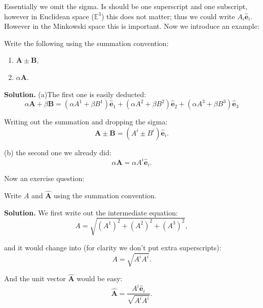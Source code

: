 \documentclass[10pt]{article}
\begin{document}
	Essentially we omit the sigma. Is should be one superscript and one subscript, however in Euclidean space ($\mathbb{E}^{3}$) this does not matter; thus we could write $A_{i}\hat{\mathbf{e}}_{i}$. However in the Minkowski space this is important. Now we introduce an example:
	\begin{example}
		Write the following using the summation convention:
		\begin{enumerate}
			\item {$\mathbf{A} \pm \mathbf{B}$,}
			\item {$\alpha \mathbf{A}$.}
		\end{enumerate}

		\vspace{1\baselineskip}
		\textbf{Solution.} (a)The first one is easily deducted:
		\begin{equation}
		  \alpha \mathbf{A} + \beta \mathbf{B} = (\alpha A^{1} + \beta B^{1})\hat{\mathbf{e}}_1 + (\alpha A^{2} + \beta B^{2})\hat{\mathbf{e}}_2 + (\alpha A^{3} + \beta B^{3})\hat{\mathbf{e}}_3
		\end{equation}

		Writing out the summation and dropping the sigma:
		\begin{equation}
		  \mathbf{A} \pm \mathbf{B} = (A^{i}\pm B^{i})\hat{\mathbf{e}}_{i}.
		\end{equation}

		(b) the second one we already did:
		\begin{equation}
		  \alpha \mathbf{A} = \alpha A^{i}\hat{\mathbf{e}}_{i}.
		\end{equation}
	\end{example}

	Now an exercise question:
	\begin{exercise}
		Write $A$ and $\hat{\mathbf{A}}$ using the summation convention. 
		
		\vspace{1\baselineskip}
		\textbf{Solution.} We first write out the intermediate equation:
		\begin{equation}
		  A = \sqrt{\left( A^{1} \right)^{2} + \left( A^{2} \right)^{2} + \left( A^{3} \right)^{2}},
		\end{equation}

		and it would change into (for clarity we don't put extra superscripts):
		\begin{equation} \label{eq0411}
		  A = \sqrt{A^{i}A^{i}}.
		\end{equation}

		And the unit vector $\hat{\mathbf{A}}$ would be easy:
		\begin{equation}
		  \hat{\mathbf{A}} = \frac{A^{i}\hat{\mathbf{e}}_{i}}{\sqrt{A^{i}A^{i}}}.
		\end{equation}
	\end{exercise}
\end{document}
